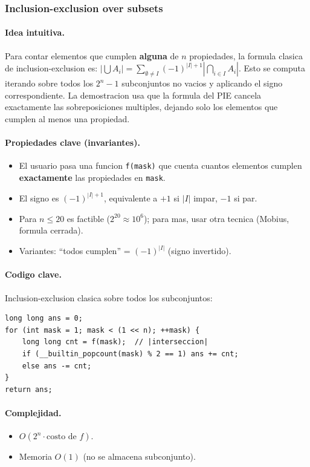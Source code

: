 ﻿\subsubsection{Inclusion-exclusion over subsets}

\paragraph{Idea intuitiva.}
Para contar elementos que cumplen \textbf{alguna} de $n$ propiedades, la formula clasica de inclusion-exclusion es: $|\bigcup A_i| = \sum_{\emptyset \ne I} (-1)^{|I|+1} |\bigcap_{i \in I} A_i|$. Esto se computa iterando sobre todos los $2^n - 1$ subconjuntos no vacios y aplicando el signo correspondiente. La demostracion usa que la formula del PIE cancela exactamente las sobreposiciones multiples, dejando solo los elementos que cumplen al menos una propiedad.

\paragraph{Propiedades clave (invariantes).}
\begin{itemize}\setlength\itemsep{0pt}
	\item El usuario pasa una funcion \texttt{f(mask)} que cuenta cuantos elementos cumplen \textbf{exactamente} las propiedades en \texttt{mask}.
	\item El signo es $(-1)^{|I|+1}$, equivalente a $+1$ si $|I|$ impar, $-1$ si par.
	\item Para $n \le 20$ es factible ($2^{20} \approx 10^6$); para mas, usar otra tecnica (Mobius, formula cerrada).
	\item Variantes: ``todos cumplen'' = $(-1)^{|I|}$ (signo invertido).
\end{itemize}

\paragraph{Codigo clave.}
Inclusion-exclusion clasica sobre todos los subconjuntos:
\begin{verbatim}
long long ans = 0;
for (int mask = 1; mask < (1 << n); ++mask) {
    long long cnt = f(mask);  // |interseccion|
    if (__builtin_popcount(mask) % 2 == 1) ans += cnt;
    else ans -= cnt;
}
return ans;
\end{verbatim}

\paragraph{Complejidad.}
\begin{itemize}\setlength\itemsep{0pt}
	\item $O(2^n \cdot \text{costo de } f)$.
	\item Memoria $O(1)$ (no se almacena subconjunto).
\end{itemize}

